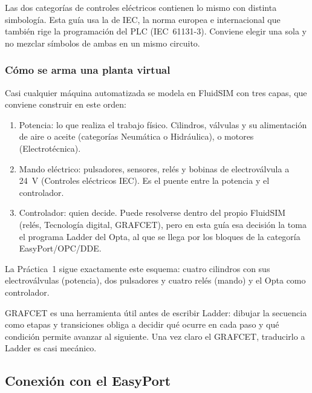 \documentclass[12pt,a4paper]{article}
\begin{document}
\begin{nota}
Las dos categorías de controles eléctricos contienen lo mismo con distinta
simbología. Esta guía usa la de IEC, la norma europea e internacional que
también rige la programación del PLC (IEC~61131-3). Conviene elegir una sola
y no mezclar símbolos de ambas en un mismo circuito.
\end{nota}

\subsubsection{Cómo se arma una planta virtual}
Casi cualquier máquina automatizada se modela en FluidSIM con tres capas,
que conviene construir en este orden:

\begin{enumerate}
    \item Potencia: lo que realiza el trabajo físico. Cilindros, válvulas y
    su alimentación de aire o aceite (categorías Neumática o Hidráulica), o
    motores (Electrotécnica).
    \item Mando eléctrico: pulsadores, sensores, relés y bobinas de
    electroválvula a 24~V (Controles eléctricos IEC). Es el puente entre la
    potencia y el controlador.
    \item Controlador: quien decide. Puede resolverse dentro del propio
    FluidSIM (relés, Tecnología digital, GRAFCET), pero en esta guía esa
    decisión la toma el programa Ladder del Opta, al que se llega por los
    bloques de la categoría EasyPort/OPC/DDE.
\end{enumerate}

La Práctica~1 sigue exactamente este esquema: cuatro cilindros con sus
electroválvulas (potencia), dos pulsadores y cuatro relés (mando) y el Opta
como controlador.

\begin{nota}
GRAFCET es una herramienta útil antes de escribir Ladder: dibujar la
secuencia como etapas y transiciones obliga a decidir qué ocurre en cada paso
y qué condición permite avanzar al siguiente. Una vez claro el GRAFCET,
traducirlo a Ladder es casi mecánico.
\end{nota}

\subsection{Conexión con el EasyPort}
\label{subsec:easyport}
\end{document}
